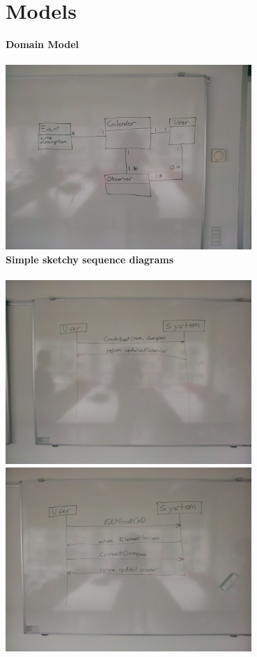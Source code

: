 \documentclass[a4paper,10pt,titlepage]{article}
\begin{document}
\section{Models}
\textbf{Domain Model}
\\ \\
\includegraphics[width=0.7\textwidth]{./domainmodel}\\[1cm] 
\textbf{Simple sketchy sequence diagrams }
\\ \\
\includegraphics[width=0.7\textwidth]{./ssd}\\[1cm] 
\includegraphics[width=0.7\textwidth]{./ssd2}\\[1cm] 
	
	
	
	
\end{document}

